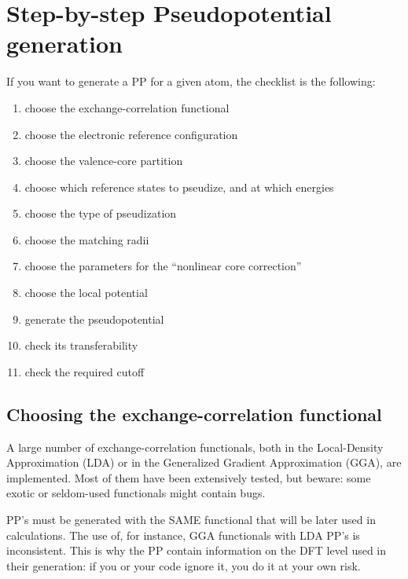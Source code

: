 \section{Step-by-step Pseudopotential generation} 

If you want to generate a PP for a given atom, the checklist is the
following:

\begin{enumerate}
\item choose the exchange-correlation functional
\item choose the electronic reference configuration
\item choose the valence-core partition
\item choose which reference states to pseudize, and at which energies
\item choose the type of pseudization
\item choose the matching radii
\item choose the parameters for the ``nonlinear core correction''
\item choose the local potential
\item generate the pseudopotential
\item check its transferability
\item check the required cutoff
\end{enumerate}

\subsection{Choosing the exchange-correlation functional}

A large number of exchange-correlation functionals, both 
in the Local-Density Approximation (LDA) or in the Generalized
Gradient Approximation (GGA), are implemented.
Most of them have been extensively tested, but beware: 
some exotic or seldom-used functionals might contain bugs.

PP's must be generated with the SAME functional that will
be later used in calculations. The use of, for instance,
GGA functionals with LDA PP's is inconsistent. This is why
the PP contain information on the DFT level used in their
generation: if you or your code ignore it, you do it at your
own risk.

